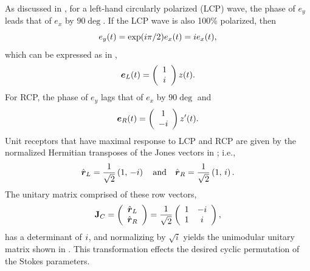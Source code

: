 As discussed in , for a left-hand circularly polarized (LCP) wave, the phase of $e_y$ leads that of $e_x$ by $90\deg$.
%
If the LCP wave is also 100\% polarized, then 
\begin{equation}e_y(t)=\exp(i \pi/2) e_x(t) = i e_x(t),\end{equation} 
which can be expressed as in ,
%
\begin{equation}
\label{eqn:lucky_left}
\mbox{\boldmath $e$}_L(t) = 
\left( \begin{array}{c}1 \\
i \end{array}\right) z(t).
\end{equation}
%
For RCP, the phase of $e_y$ lags that of $e_x$ by $90\deg$ and
%
\begin{equation}
\label{eqn:lucky_right}
\mbox{\boldmath $e$}_R(t) = 
\left( \begin{array}{c}
1 \\
-i \end{array}\right) z'(t).
\end{equation}
%
Unit receptors that have maximal response to LCP and RCP are 
given by the normalized Hermitian transposes of the Jones vectors 
in ; i.e.,
%
\begin{equation}
\label{eqn:lucky_receptor}
\hat{\mbox{\boldmath $r$}}_L = \frac{1}{\sqrt{2}} \left( 1, \, -i \right)
\quad\text{and}\quad
\hat{\mbox{\boldmath $r$}}_R = \frac{1}{\sqrt{2}} \left( 1, \, i \right).
\end{equation}
%
The unitary matrix comprised of these row vectors,
%
\begin{equation}
{\bf J}_C
= \left( \begin{array}{c}
    \hat{\mbox{\boldmath $r$}}_L \\
    \hat{\mbox{\boldmath $r$}}_R
\end{array} \right)
= \frac{1}{\sqrt{2}}
  \left( \begin{array}{cc}
    1 & -i \\
    1 & i
  \end{array} \right),
\end{equation}
%
has a determinant of $i$, and normalizing by $\sqrt{i}$ yields
the unimodular unitary matrix shown in .
%
This transformation effects the desired
cyclic permutation of the Stokes parameters.

\iffalse

